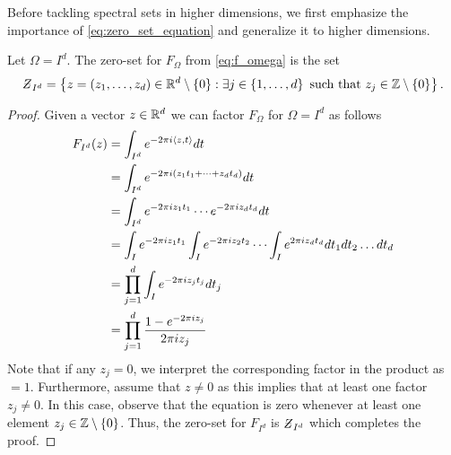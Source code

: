\documentclass[../thesis.tex]{subfiles}
\begin{document}
Before tackling spectral sets in higher dimensions, we first emphasize the importance of \cref{eq:zero_set_equation} and generalize it to higher dimensions. 
\begin{lemma}\label{lem:zero_set_jp_1_5}
    Let $\Omega = I^d$. The zero-set for $F_{\Omega}$ from \cref{eq:f_omega} %
    is the set
    \begin{equation*}
        \Zstroke_{I^d} = \braqMed{ z = \brac{z_1,\dots,z_d}\in \R^d \setminus \braqMed{0} : \exists \space j \in \braqMed{1,\dots, d} \text{ such that } z_j \in  \intnozero}.
    \end{equation*}
\end{lemma}

\begin{proof} %
    Given a vector $z \in \mathbb{R}^d$ we can factor $F_{\Omega}$ for $\Omega = I^d$ as follows
    \begin{align*}
        F_{I^d} (z) &= \int_{I^d} e^{-2 \pi i \braa{z,t}} dt\\
        &= \int_{I^d} e^{-2\pi i  (z_1 t_1 + \dots +z_d t_d)} dt\\
        &= \int_{I^d} e^{-2\pi i z_1 t_1}  \cdots e^{-2\pi i z_d t_d}  dt\\
        &= \int_{I} e^{-2\pi i z_1 t_1} \int_{I} e^{-2\pi i z_2 t_2}  \cdots \int_{I} e^{2\pi i z_d t_d}  dt_1 dt_2\dots dt_d\\ %
        &= \prod_{j=1}^d \int_I e^{-2\pi i z_j t_j} dt_j\\
        &= \prod_{j=1}^d \frac{1-e^{-2 \pi i z_j}}{2 \pi i z_j} %
    \end{align*}
    Note that if any $z_j = 0$, we interpret the corresponding factor in the product as $=1$. Furthermore, assume that $z\neq 0$ as this implies that at least one factor $z_j\neq 0$. In this case, observe that the equation is zero whenever at least one element $z_j\in \mathbb{Z}\setminus\{0\}$. %
    Thus, the zero-set for $F_{I^d}$ is $\Zstroke_{I^d}$ which completes the proof. %
\end{proof}
\end{document}
